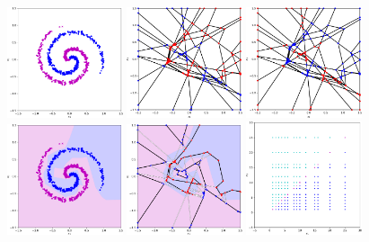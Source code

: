 \documentclass{article}
\begin{document}
\begin{figure}
    \centering
    \vspace{-5mm}
    \includegraphics[width=3.4cm]{Figures/spiral_dataset1.pdf}
    \includegraphics[width=3.4cm]{Figures/spiral_membership1_1.pdf}
    \includegraphics[width=3.4cm]{Figures/spiral_membership1_2.pdf}
    \includegraphics[width=3.4cm]{Figures/spiral_decision_boundary1_1.pdf}
    \includegraphics[width=3.4cm]{Figures/spiral_decision_boundary1_2.pdf}
    \centering
    \includegraphics[width=3.4cm]{Figures/dataset2.pdf}

\end{figure}
\end{document}
